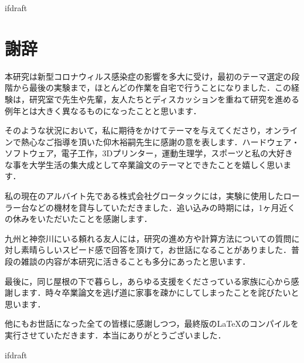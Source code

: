 \expandafter\ifx\csname ifdraft\endcsname\relax
 
\fi

\section*{謝辞}

本研究は新型コロナウィルス感染症の影響を多大に受け，最初のテーマ選定の段階から最後の実験まで，ほとんどの作業を自宅で行うことになりました．この経験は，研究室で先生や先輩，友人たちとディスカッションを重ねて研究を進める例年とは大きく異なるものになったことと思います．

そのような状況において，私に期待をかけてテーマを与えてくださり，オンラインで熱心なご指導を頂いた仰木裕嗣先生に感謝の意を表します．ハードウェア・ソフトウェア，電子工作，3Dプリンター，運動生理学，スポーツと私の大好きな事を大学生活の集大成として卒業論文のテーマとできたことを嬉しく思います．

私の現在のアルバイト先である株式会社グロータックには，実験に使用したローラー台などの機材を貸与していただきました．追い込みの時期には，1ヶ月近くの休みをいただいたことを感謝します．

九州と神奈川にいる頼れる友人には，研究の進め方や計算方法についての質問に対し素晴らしいスピード感で回答を頂けて，お世話になることがありました．普段の雑談の内容が本研究に活きることも多分にあったと思います．

最後に，同じ屋根の下で暮らし，あらゆる支援をくださっている家族に心から感謝します．時々卒業論文を逃げ道に家事を疎かにしてしまったことを詫びたいと思います．

他にもお世話になった全ての皆様に感謝しつつ，最終版のLaTeXのコンパイルを実行させていただきます．本当にありがとうございました．

\expandafter\ifx\csname ifdraft\endcsname\relax
  
\fi
